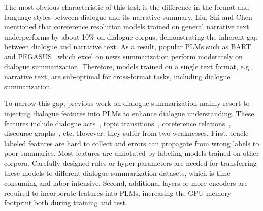 The most obvious characteristic of this task is the difference in the format and language styles 
between dialogue and its narrative summary.
Liu, Shi and Chen~ mentioned
that coreference resolution models trained on general narrative text 
underperforms by about 10\% on dialogue corpus, 
demonstrating the inherent gap between dialogue and narrative text. 
As a result, popular PLMs such as BART~\cite{lewis2020bart} and 
PEGASUS~\cite{zhang2020pegasus} which excel on news summarization 
perform moderately on dialogue summarization.
Therefore, models trained on a single text format, e.g., narrative text, 
are sub-optimal for cross-format tasks, including dialogue summarization.

To narrow this gap, previous work on dialogue summarization mainly 
resort to injecting dialogue features into PLMs to enhance dialogue 
understanding. These features include dialogue acts~\cite{goo2018abstractive}, topic transitions~\cite{chen2020multi}, coreference relations~\cite{liu2021coreference}, discourse graphs~\cite{chen2021structure}, etc. 
However, they suffer from two weaknesses. 
First, oracle labeled features are hard to collect and 
errors can propagate from wrong labels to poor summaries.
Most features are annotated by labeling models trained on other corpora. 
Carefully designed rules or hyper-parameters are needed for transferring 
these models to different dialogue summarization datasets, which is 
time-consuming and labor-intensive.
Second, additional layers or more encoders are required to incorporate 
features into PLMs, increasing the GPU memory footprint both during 
training and test.


